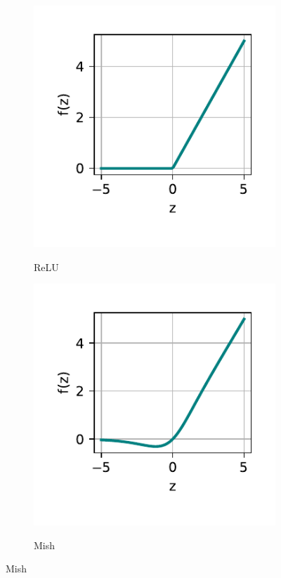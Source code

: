 \begin{figure}[H]
\begin{subfigure}[H]{.4\textwidth}
        \centering
        \caption{ReLU}
        \includegraphics[scale=0.8]{img/img-fundamentacao-relu.pdf}
        \label{fig:fund-funcs-relu}
    \end{subfigure}
    \begin{subfigure}[H]{.4\textwidth}
        \centering
        \caption{Mish}
        \includegraphics[scale=0.8]{img/img-fundamentacao-mish.pdf}
        \label{fig:fund-funcs-mish}
    \end{subfigure}
	\label{fig:fund-funcs}
\end{figure}

